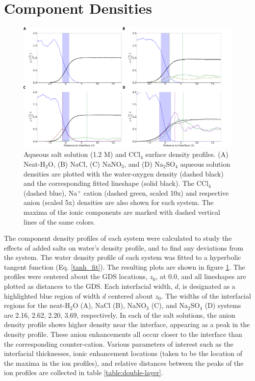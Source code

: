 \section{Component Densities}

\begin{figure}[h!]
\begin{center}
	\includegraphics[scale=1.0]{images/densities.png}
	\caption{Aqueous salt solution (1.2 M) and CCl$_4$ surface density profiles. (A) Neat-H$_2$O, (B) NaCl, (C) NaNO$_3$, and (D) Na$_2$SO$_4$ aqueous solution densities are plotted with the water-oxygen density (dashed black) and the corresponding fitted lineshape (solid black). The CCl$_4$ (dashed blue), Na$^+$ cation (dashed green, scaled 10x) and respective anion (scaled 5x) densities are also shown for each system. The maxima of the ionic components are marked with dashed vertical lines of the same colors.}
	\label{fig:density-plots}
\end{center}
\end{figure}

The component density profiles of each system were calculated to study the effects of added salts on water's density profile, and to find any deviations from the \ctcwat system. The water density profile of each system was fitted to a hyperbolic tangent function (Eq. \ref{tanh_fit}). The resulting plots are shown in figure \ref{fig:density-plots}. The profiles were centered about the GDS locations, $z_0$, at 0.0\angs, and all lineshapes are plotted as distances to the GDS. Each interfacial width, $d$, is designated as a highlighted blue region of width $d$ centered about $z_0$.  The widths of the interfacial regions for the neat-H$_2$O (A), NaCl (B), NaNO$_3$ (C), and Na$_2$SO$_4$ (D) systems are 2.16, 2.62, 2.20, 3.69\angs, respectively. In each of the salt solutions, the anion density profile shows higher density near the interface, appearing as a peak in the density profile. These anion enhancements all occur closer to the interface than the corresponding counter-cation. Various parameters of interest such as the interfacial thicknesses, ionic enhancement locations (taken to be the location of the maxima in the ion profiles), and relative distances between the peaks of the ion profiles are collected in table \ref{table:double-layer}.

